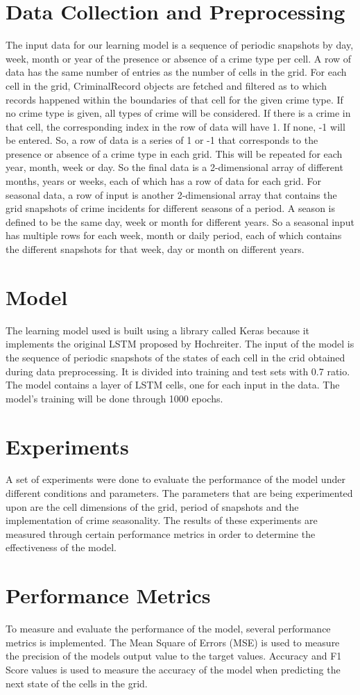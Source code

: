 \section{Data Collection and Preprocessing}
    The input data for our learning model is a sequence of periodic snapshots by day, week, month or year of the presence or absence of a crime type per cell. A row of data has the same number of entries as the number of cells in the grid. For each cell in the grid, CriminalRecord objects are fetched and filtered as to which records happened within the boundaries of that cell for the given crime type. If no crime type is given, all types of crime will be considered. If there is a crime in that cell, the corresponding index in the row of data will have 1. If none, -1 will be entered. So, a row of data is a series of 1 or -1 that corresponds to the presence or absence of a crime type in each grid. This will be repeated for each year, month, week or day. So the final data is a 2-dimensional array of different months, years or weeks, each of which has a row of data for each grid.
    For seasonal data, a row of input is another 2-dimensional array that contains the grid snapshots of crime incidents for different seasons of a period. A season is defined to be the same day, week or month for different years. So a seasonal input has multiple rows for each week, month or daily period, each of which contains the different snapshots for that week, day or month on different years.

\section{Model}
    The learning model used is built using a library called Keras because it implements the original LSTM proposed by Hochreiter. The input of the model is the sequence of periodic snapshots of the states of each cell in the crid obtained during data preprocessing. It is divided into training and test sets with 0.7 ratio. The model contains a layer of LSTM cells, one for each input in the data. The model's training will be done through 1000 epochs.

\section{Experiments}
    A set of experiments were done to evaluate the performance of the model under different conditions and parameters. The parameters that are being experimented upon are the cell dimensions of the grid, period of snapshots and the implementation of crime seasonality. The results of these experiments are measured through certain performance metrics in order to determine the effectiveness of the model.

\section{Performance Metrics}
    To measure and evaluate the performance of the model, several performance metrics is implemented. The Mean Square of Errors (MSE) is used to measure the precision of the models output value to the target values. Accuracy and F1 Score values is used to measure the accuracy of the model when predicting the next state of the cells in the grid.
